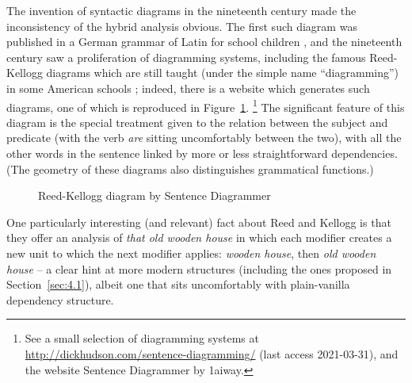 \documentclass[output=paper
 	        ,biblatex
                ,babelshorthands
                ,newtxmath
                ,draftmode
                ,colorlinks, citecolor=brown
]{langscibook}
\begin{document}
The invention of syntactic diagrams in the nineteenth century made the inconsistency of the hybrid
analysis obvious. The first such diagram was published in a German grammar of Latin for school
children \citep{Billroth1832}, and the nineteenth century saw a proliferation of diagramming
systems, including the famous Reed-Kellogg diagrams which are still taught (under the simple name
``diagramming'') in some American schools \citep{ReedKellog1890}; indeed, there is a website which
generates such diagrams, one of which is reproduced in Figure~\ref{fig:2}.%
%
\footnote{See a small selection of diagramming systems at
  \url{http://dickhudson.com/sentence-diagramming/} (last access 2021-03-31), and the website
  Sentence Diagrammer by 1aiway.} 
%
The significant feature of this diagram is the special treatment given to the relation between the
subject and predicate (with the verb \emph{are} sitting uncomfortably between the two), with all the
other words in the sentence linked by more or less straightforward dependencies. (The geometry of
these diagrams also distinguishes grammatical functions.) 
 
 \begin{figure}
 	\centering
{}
	\caption{Reed-Kellogg diagram by Sentence Diagrammer}
	\label{fig:2}
 \end{figure}
 
One particularly interesting (and relevant) fact about Reed and Kellogg is that they offer an analysis of \emph{that old wooden house} in which each modifier creates a new unit to which the next modifier applies: \emph{wooden house}, then \emph{old wooden house} \citep[18]{Percival1976} – a clear hint at more modern structures (including the ones proposed in Section~\ref{sec:4.1}), albeit one that sits uncomfortably with plain-vanilla dependency structure.
\end{document}
